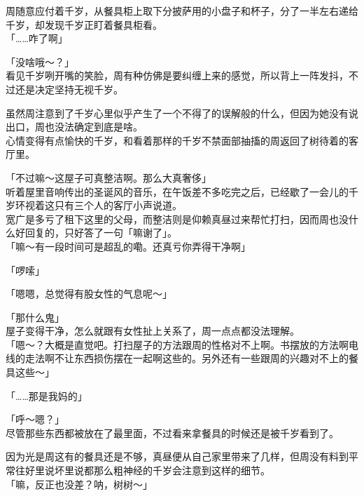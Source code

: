 周随意应付着千岁，从餐具柜上取下分披萨用的小盘子和杯子，分了一半左右递给千岁，却发现千岁正盯着餐具柜看。\\

「……咋了啊」

「没啥哦～？」\\

看见千岁咧开嘴的笑脸，周有种仿佛是要纠缠上来的感觉，所以背上一阵发抖，不过还是决定坚持无视千岁。

虽然周注意到了千岁心里似乎产生了一个不得了的误解般的什么，但因为她没有说出口，周也没法确定到底是啥。\\

心情变得有点愉快的千岁，和看着那样的千岁不禁面部抽搐的周返回了树待着的客厅里。\\

\vspace{2\baselineskip}

「不过嘛～这屋子可真整洁啊。那么大真奢侈」\\

听着屋里音响传出的圣诞风的音乐，在午饭差不多吃完之后，已经歇了一会儿的千岁环视着这只有三个人的客厅小声说道。\\

宽广是多亏了租下这里的父母，而整洁则是仰赖真昼过来帮忙打扫，因而周也没什么好回复的，只好答了一句「嘛谢了」。\\

「嘛～有一段时间可是超乱的嘞。还真亏你弄得干净啊」

「啰嗦」

「嗯嗯，总觉得有股女性的气息呢～」

「那什么鬼」\\

屋子变得干净，怎么就跟有女性扯上关系了，周一点点都没法理解。\\

「嗯～？大概是直觉吧。打扫屋子的方法跟周的性格对不上啊。书摆放的方法啊电线的走法啊不让东西损伤摆在一起啊这些的。另外还有一些跟周的兴趣对不上的餐具这些～」

「……那是我妈的」

「呼～嗯？」\\

尽管那些东西都被放在了最里面，不过看来拿餐具的时候还是被千岁看到了。

因为光是周这有的餐具还是不够，真昼便从自己家里带来了几样，但周没有料到平常往好里说坏里说都那么粗神经的千岁会注意到这样的细节。\\

「嘛，反正也没差？呐，树树～」\\

